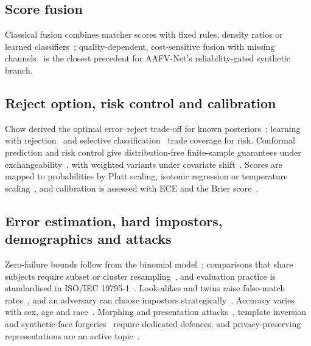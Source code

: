 \documentclass[journal]{IEEEtran}
\begin{document}
\subsection{Score fusion}
Classical fusion combines matcher scores with fixed rules, density ratios or learned classifiers~\cite{kittler1998combining,ross2003fusion,nandakumar2008lr}; quality-dependent, cost-sensitive fusion with missing channels~\cite{poh2009quality} is the closest precedent for AAFV-Net's reliability-gated synthetic branch.

\subsection{Reject option, risk control and calibration}
Chow derived the optimal error--reject trade-off for known posteriors~\cite{chow1970reject}; learning with rejection~\cite{herbei2006reject} and selective classification~\cite{elyaniv2010selective,geifman2017selective} trade coverage for risk. Conformal prediction and risk control give distribution-free finite-sample guarantees under exchangeability~\cite{vovk2005alrw,angelopoulos2024crc,angelopoulos2021ltt}, with weighted variants under covariate shift~\cite{tibshirani2019covshift}. Scores are mapped to probabilities by Platt scaling, isotonic regression or temperature scaling~\cite{platt1999,zadrozny2002isotonic,guo2017calibration}, and calibration is assessed with ECE and the Brier score~\cite{naeini2015ece,brier1950}.

\subsection{Error estimation, hard impostors, demographics and attacks}
Zero-failure bounds follow from the binomial model~\cite{clopper1934,hanley1983rule3}; comparisons that share subjects require subset or cluster resampling~\cite{bolle2004subsets,schuckers2010book,efron1994bootstrap}, and evaluation practice is standardised in ISO/IEC 19795-1~\cite{iso19795_1}. Look-alikes and twins raise false-match rates~\cite{paone2014twins}, and an adversary can choose impostors strategically~\cite{hu2025neyman}. Accuracy varies with sex, age and race~\cite{klare2012demographics,grother2019frvt_part3,krishnapriya2020race,buolamwini2018gendershades}. Morphing and presentation attacks~\cite{scherhag2019morph,iso30107_3}, template inversion~\cite{otroshi2024inversion} and synthetic-face forgeries~\cite{zhou2024openset} require dedicated defences, and privacy-preserving representations are an active topic~\cite{razeghi2026privacy}.
\end{document}

